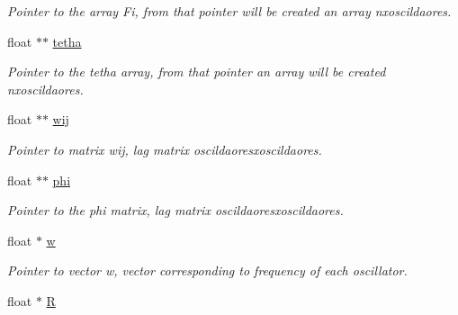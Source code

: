 \begin{DoxyCompactItemize}
\begin{DoxyCompactList}\small\item\em Pointer to the array Fi, from that pointer will be created an array nxoscildaores. \end{DoxyCompactList}\item 
float $\ast$$\ast$ \hyperlink{classCpg_af954d4061c759b6767e8a44e66368834}{tetha}\hypertarget{classCpg_af954d4061c759b6767e8a44e66368834}{}\label{classCpg_af954d4061c759b6767e8a44e66368834}

\begin{DoxyCompactList}\small\item\em Pointer to the tetha array, from that pointer an array will be created nxoscildaores. \end{DoxyCompactList}\item 
float $\ast$$\ast$ \hyperlink{classCpg_af83842cbcf4b259e90159cf8dcb0c2c5}{wij}\hypertarget{classCpg_af83842cbcf4b259e90159cf8dcb0c2c5}{}\label{classCpg_af83842cbcf4b259e90159cf8dcb0c2c5}

\begin{DoxyCompactList}\small\item\em Pointer to matrix wij, lag matrix oscildaoresxoscildaores. \end{DoxyCompactList}\item 
float $\ast$$\ast$ \hyperlink{classCpg_ab2ad53b02b844a42219641124b2f9a91}{phi}\hypertarget{classCpg_ab2ad53b02b844a42219641124b2f9a91}{}\label{classCpg_ab2ad53b02b844a42219641124b2f9a91}

\begin{DoxyCompactList}\small\item\em Pointer to the phi matrix, lag matrix oscildaoresxoscildaores. \end{DoxyCompactList}\item 
float $\ast$ \hyperlink{classCpg_ac9ca74e1fb0c062a36a429def9e09fd4}{w}\hypertarget{classCpg_ac9ca74e1fb0c062a36a429def9e09fd4}{}\label{classCpg_ac9ca74e1fb0c062a36a429def9e09fd4}

\begin{DoxyCompactList}\small\item\em Pointer to vector w, vector corresponding to frequency of each oscillator. \end{DoxyCompactList}\item 
float $\ast$ \hyperlink{classCpg_a26600aab5d25563f09d8122ad054564d}{R}\hypertarget{classCpg_a26600aab5d25563f09d8122ad054564d}{}\label{classCpg_a26600aab5d25563f09d8122ad054564d}


\end{DoxyCompactItemize}
